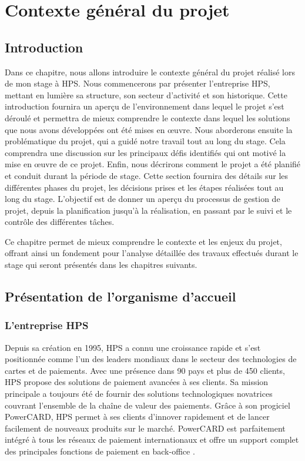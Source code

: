 
\chapter{Contexte général du projet}
\section*{Introduction}
Dans ce chapitre, nous allons introduire le contexte général du projet réalisé lors de mon stage à HPS. Nous commencerons par présenter l'entreprise HPS, mettant en lumière sa structure, son secteur d'activité et son historique. Cette introduction fournira un aperçu de l'environnement dans lequel le projet s'est déroulé et permettra de mieux comprendre le contexte dans lequel les solutions que nous avons développées ont été mises en œuvre. Nous aborderons ensuite la problématique du projet, qui a guidé notre travail tout au long du stage. Cela comprendra une discussion sur les principaux défis identifiés qui ont motivé la mise en œuvre de ce projet. Enfin, nous décrirons comment le projet a été planifié et conduit durant la période de stage. Cette section fournira des détails sur les différentes phases du projet, les décisions prises et les étapes réalisées tout au long du stage. L'objectif est de donner un aperçu du processus de gestion de projet, depuis la planification jusqu'à la réalisation, en passant par le suivi et le contrôle des différentes tâches. 

Ce chapitre permet de mieux comprendre le contexte et les enjeux du projet, offrant ainsi un fondement pour l'analyse détaillée des travaux effectués durant le stage qui seront présentés dans les chapitres suivants. 

\section{Présentation de l’organisme d’accueil}
\subsection{L’entreprise HPS }
Depuis sa création en 1995, HPS a connu une croissance rapide et s'est positionnée comme l'un des leaders mondiaux dans le secteur des technologies de cartes et de paiements. Avec une présence dans 90 pays et plus de 450 clients, HPS propose des solutions de paiement avancées à ses clients. Sa mission principale a toujours été de fournir des solutions technologiques novatrices couvrant l'ensemble de la chaîne de valeur des paiements. Grâce à son progiciel PowerCARD, HPS permet à ses clients d'innover rapidement et de lancer facilement de nouveaux produits sur le marché. PowerCARD est parfaitement intégré à tous les réseaux de paiement internationaux et offre un support complet des principales fonctions de paiement en back-office \cite{hps-site}.


